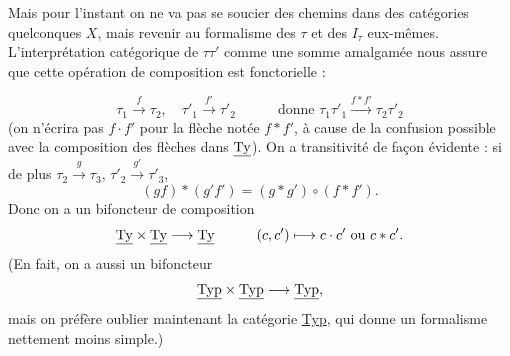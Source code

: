 Mais pour l'instant on ne va pas se soucier des chemins dans des catégories quelconques $X$, mais revenir au formalisme des $\tau$ et des $I_\tau$ eux-mêmes. L'interprétation catégorique de $\tau\tau'$ comme une somme amalgamée nous assure que cette opération de composition est fonctorielle :

\[
\tau_1 \xrightarrow{\ f\ } \tau_2, \quad \tau'_1 \xrightarrow{\ f'\ } \tau'_2 \qquad\quad \text{donne } \tau_1\tau'_1 \xrightarrow{f*f'} \tau_2\tau'_2
\]
(on n'écrira pas $f \cdot f'$ pour la flèche notée $f * f'$, à cause de la confusion possible avec la composition des flèches dans $\underline{\mathrm{Ty}}$). On a transitivité de façon évidente : si de plus $\tau_2 \xrightarrow{\ g\ } \tau_3$, $\tau'_2 \xrightarrow{\ g'\ } \tau'_3$,
\[
(gf) * (g'f') = (g * g') \circ (f * f').
\]
Donc on a un bifoncteur de composition
\[
\underline{\mathrm{Ty}} \times \underline{\mathrm{Ty}} \longrightarrow \underline{\mathrm{Ty}} \qquad\quad (c,c') \longmapsto c \cdot c' \text{ ou } c * c'.
\]
(En fait, on a aussi un bifoncteur
\[
\underline{\mathrm{Typ}} \times \underline{\mathrm{Typ}} \longrightarrow \underline{\mathrm{Typ}},
\]
mais on préfère oublier maintenant la catégorie \underline{Typ}, qui donne un formalisme nettement moins simple.)


